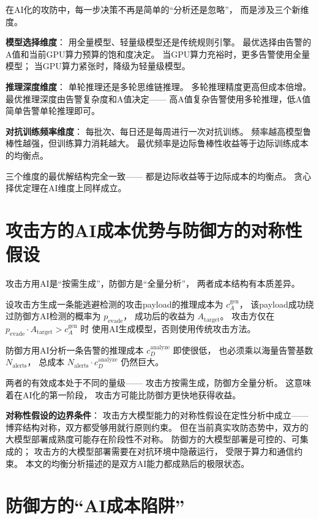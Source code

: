\documentclass[11pt,a4paper]{article}
\begin{document}
在AI化的攻防中，每一步决策不再是简单的“分析还是忽略”，
而是涉及三个新维度。

\textbf{模型选择维度}：
用全量模型、轻量级模型还是传统规则引擎。
最优选择由告警的A值和当前GPU算力预算的饱和度决定。
当GPU算力充裕时，更多告警使用全量模型；
当GPU算力紧张时，降级为轻量级模型。

\textbf{推理深度维度}：
单轮推理还是多轮思维链推理。
多轮推理精度更高但成本倍增。
最优推理深度由告警复杂度和A值决定——
高A值复杂告警使用多轮推理，低A值简单告警单轮推理即可。

\textbf{对抗训练频率维度}：
每批次、每日还是每周进行一次对抗训练。
频率越高模型鲁棒性越强，但训练算力消耗越大。
最优频率是边际鲁棒性收益等于边际训练成本的均衡点。

三个维度的最优解结构完全一致——
都是边际收益等于边际成本的均衡点。
贪心择优定理在AI维度上同样成立。

\section{攻击方的AI成本优势与防御方的对称性假设}

攻击方用AI是“按需生成”，防御方是“全量分析”，
两者成本结构有本质差异。

设攻击方生成一条能逃避检测的攻击payload的推理成本为 \(c_A^{\text{gen}}\)，
该payload成功绕过防御方AI检测的概率为 \(p_{\text{evade}}\)，
成功后的收益为 \(A_{\text{target}}\)。
攻击方仅在 \(p_{\text{evade}} \cdot A_{\text{target}} > c_A^{\text{gen}}\) 时
使用AI生成模型，否则使用传统攻击方法。

防御方用AI分析一条告警的推理成本 \(c_D^{\text{analyze}}\) 即使很低，
也必须乘以海量告警基数 \(N_{\text{alerts}}\)，
总成本 \(N_{\text{alerts}} \cdot c_D^{\text{analyze}}\) 仍然巨大。

两者的有效成本处于不同的量级——
攻击方按需生成，防御方全量分析。
这意味着在AI化的第一阶段，
攻击方可能比防御方更快地获得收益。

\textbf{对称性假设的边界条件}：
攻击方大模型能力的对称性假设在定性分析中成立——
博弈结构对称，双方都受够用就行原则约束。
但在当前真实攻防态势中，双方的大模型部署成熟度可能存在阶段性不对称。
防御方的大模型部署是可控的、可集成的；
攻击方的大模型部署需要在对抗环境中隐蔽运行，
受限于算力和通信约束。
本文的均衡分析描述的是双方AI能力都成熟后的极限状态。

\section{防御方的“AI成本陷阱”}
\end{document}
